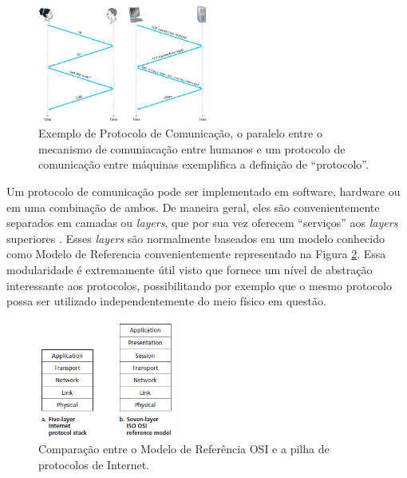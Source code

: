 \begin{figure}[!htb]
	\centering
	\includegraphics[width=0.5\textwidth]{./figuras/Explicacao-Protocolo.png} %
	\caption[Exemplo de Protocolo de Comunicação]{Exemplo de Protocolo de Comunicação, o paralelo entre o mecanismo de comuniacação entre humanos e um protocolo de comunicação entre máquinas exemplifica a definição de ``protocolo''.}
	\label{fig_explicacao_protocolo}
\end{figure}

Um protocolo de comunicação pode ser implementado em software, hardware ou em uma combinação de ambos. De maneira geral, eles são convenientemente separados em camadas ou \emph{layers}, que por sua vez oferecem ``serviços'' aos \emph{layers} superiores \cite{Book-Kurose2013}. Esses \emph{layers} são normalmente baseados em um modelo conhecido como Modelo de Referencia  convenientemente representado na Figura \ref{fig_modelo_OSI}. Essa modularidade é extremamente útil visto que fornece um nível de abstração interessante aos protocolos, possibilitando por exemplo que o mesmo protocolo possa ser utilizado independentemente do meio físico em questão.

\begin{figure}[!htb]
	\centering
	\includegraphics[width=0.4\textwidth]{./figuras/Modelo-OSI.png} %
	\caption[Modelo OSI]{Comparação entre o Modelo de Referência OSI e a pilha de protocolos de Internet.}
	\label{fig_modelo_OSI}
\end{figure}

